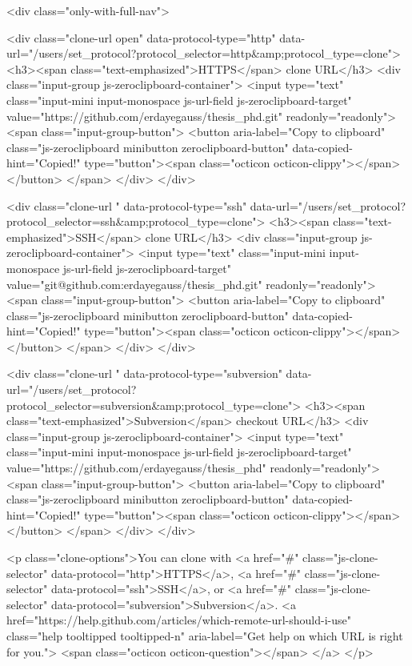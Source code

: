               <div class="only-with-full-nav">
                  
<div class="clone-url open"
  data-protocol-type="http"
  data-url="/users/set_protocol?protocol_selector=http&amp;protocol_type=clone">
  <h3><span class="text-emphasized">HTTPS</span> clone URL</h3>
  <div class="input-group js-zeroclipboard-container">
    <input type="text" class="input-mini input-monospace js-url-field js-zeroclipboard-target"
           value="https://github.com/erdayegauss/thesis_phd.git" readonly="readonly">
    <span class="input-group-button">
      <button aria-label="Copy to clipboard" class="js-zeroclipboard minibutton zeroclipboard-button" data-copied-hint="Copied!" type="button"><span class="octicon octicon-clippy"></span></button>
    </span>
  </div>
</div>

  
<div class="clone-url "
  data-protocol-type="ssh"
  data-url="/users/set_protocol?protocol_selector=ssh&amp;protocol_type=clone">
  <h3><span class="text-emphasized">SSH</span> clone URL</h3>
  <div class="input-group js-zeroclipboard-container">
    <input type="text" class="input-mini input-monospace js-url-field js-zeroclipboard-target"
           value="git@github.com:erdayegauss/thesis_phd.git" readonly="readonly">
    <span class="input-group-button">
      <button aria-label="Copy to clipboard" class="js-zeroclipboard minibutton zeroclipboard-button" data-copied-hint="Copied!" type="button"><span class="octicon octicon-clippy"></span></button>
    </span>
  </div>
</div>

  
<div class="clone-url "
  data-protocol-type="subversion"
  data-url="/users/set_protocol?protocol_selector=subversion&amp;protocol_type=clone">
  <h3><span class="text-emphasized">Subversion</span> checkout URL</h3>
  <div class="input-group js-zeroclipboard-container">
    <input type="text" class="input-mini input-monospace js-url-field js-zeroclipboard-target"
           value="https://github.com/erdayegauss/thesis_phd" readonly="readonly">
    <span class="input-group-button">
      <button aria-label="Copy to clipboard" class="js-zeroclipboard minibutton zeroclipboard-button" data-copied-hint="Copied!" type="button"><span class="octicon octicon-clippy"></span></button>
    </span>
  </div>
</div>



<p class="clone-options">You can clone with
  <a href="#" class="js-clone-selector" data-protocol="http">HTTPS</a>, <a href="#" class="js-clone-selector" data-protocol="ssh">SSH</a>, or <a href="#" class="js-clone-selector" data-protocol="subversion">Subversion</a>.
  <a href="https://help.github.com/articles/which-remote-url-should-i-use" class="help tooltipped tooltipped-n" aria-label="Get help on which URL is right for you.">
    <span class="octicon octicon-question"></span>
  </a>
</p>



